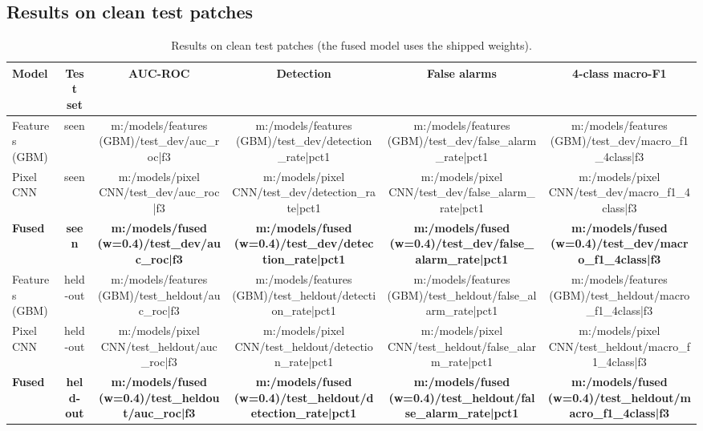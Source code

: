\subsection{Results on clean test patches}
\begin{table}[!htbp]
\centering\small
\begin{tabular}{|l|c|c|c|c|c|}
\hline
\textbf{Model} & \textbf{Test set} & \textbf{AUC-ROC} & \textbf{Detection} & \textbf{False alarms} & \textbf{4-class macro-F1}\\
\hline
Features (GBM) & seen & {{m:/models/features (GBM)/test_dev/auc_roc|f3}} & {{m:/models/features (GBM)/test_dev/detection_rate|pct1}} & {{m:/models/features (GBM)/test_dev/false_alarm_rate|pct1}} & {{m:/models/features (GBM)/test_dev/macro_f1_4class|f3}}\\
\hline
Pixel CNN & seen & {{m:/models/pixel CNN/test_dev/auc_roc|f3}} & {{m:/models/pixel CNN/test_dev/detection_rate|pct1}} & {{m:/models/pixel CNN/test_dev/false_alarm_rate|pct1}} & {{m:/models/pixel CNN/test_dev/macro_f1_4class|f3}}\\
\hline
\textbf{Fused} & \textbf{seen} & \textbf{{{m:/models/fused (w=0.4)/test_dev/auc_roc|f3}}} & \textbf{{{m:/models/fused (w=0.4)/test_dev/detection_rate|pct1}}} & \textbf{{{m:/models/fused (w=0.4)/test_dev/false_alarm_rate|pct1}}} & \textbf{{{m:/models/fused (w=0.4)/test_dev/macro_f1_4class|f3}}}\\
\hline
Features (GBM) & held-out & {{m:/models/features (GBM)/test_heldout/auc_roc|f3}} & {{m:/models/features (GBM)/test_heldout/detection_rate|pct1}} & {{m:/models/features (GBM)/test_heldout/false_alarm_rate|pct1}} & {{m:/models/features (GBM)/test_heldout/macro_f1_4class|f3}}\\
\hline
Pixel CNN & held-out & {{m:/models/pixel CNN/test_heldout/auc_roc|f3}} & {{m:/models/pixel CNN/test_heldout/detection_rate|pct1}} & {{m:/models/pixel CNN/test_heldout/false_alarm_rate|pct1}} & {{m:/models/pixel CNN/test_heldout/macro_f1_4class|f3}}\\
\hline
\textbf{Fused} & \textbf{held-out} & \textbf{{{m:/models/fused (w=0.4)/test_heldout/auc_roc|f3}}} & \textbf{{{m:/models/fused (w=0.4)/test_heldout/detection_rate|pct1}}} & \textbf{{{m:/models/fused (w=0.4)/test_heldout/false_alarm_rate|pct1}}} & \textbf{{{m:/models/fused (w=0.4)/test_heldout/macro_f1_4class|f3}}}\\
\hline
\end{tabular}
\caption{Results on clean test patches (the fused model uses the shipped weights).}
\end{table}

